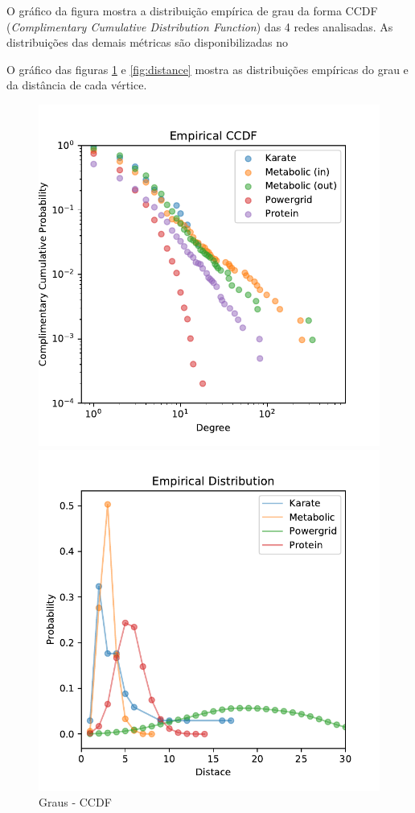 \documentclass[12pt,a4paper]{article}
\begin{document}
	O gráfico da figura mostra a distribuição empírica de grau da forma CCDF (\textit{Complimentary Cumulative Distribution Function}) das 4 redes analisadas. As distribuições das demais métricas são disponibilizadas no 
	
	O gráfico das figuras \ref{fig:degree} e \ref{fig:distance} mostra as distribuições empíricas do grau e da distância de cada vértice. 
	
	\begin{figure}[hbt]
		\centering
		\begin{minipage}{.5\textwidth}
			\centering
			\includegraphics[width=1\linewidth]{degree}
			\caption{Graus - CCDF}
			\label{fig:degree}
		\end{minipage}%
		\begin{minipage}{.5\textwidth}
			\centering
			\includegraphics[width=1\linewidth]{distance}

\end{minipage}
\end{figure}
\end{document}
